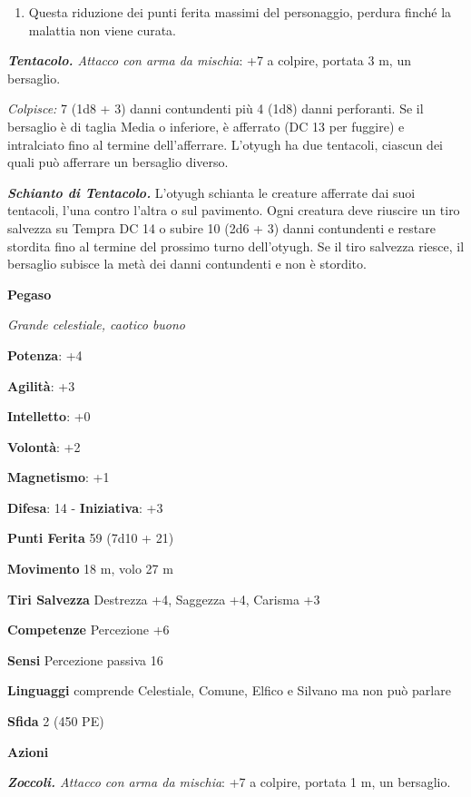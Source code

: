 \begin{multicols}{2}
\begin{enumerate}
\def\labelenumi{\arabic{enumi}.}
\item
  Questa riduzione dei punti ferita massimi del personaggio, perdura
  finché la malattia non viene curata.
\end{enumerate}


\emph{\textbf{Tentacolo.} Attacco con arma da mischia}: +7 a colpire,
portata 3 m, un bersaglio.

\emph{Colpisce:} 7 (1d8 + 3) danni contundenti più 4 (1d8) danni
perforanti. Se il bersaglio è di taglia Media o inferiore, è afferrato
(DC 13 per fuggire) e intralciato fino al termine dell'afferrare.
L'otyugh ha due tentacoli, ciascun dei quali può afferrare un bersaglio
diverso.

\emph{\textbf{Schianto di Tentacolo.}} L'otyugh schianta le creature
afferrate dai suoi tentacoli, l'una contro l'altra o sul pavimento. Ogni
creatura deve riuscire un tiro salvezza su Tempra DC 14 o subire 10 (2d6
+ 3) danni contundenti e restare stordita fino al termine del prossimo
turno dell'otyugh. Se il tiro salvezza riesce, il bersaglio subisce la
metà dei danni contundenti e non è stordito.




\textbf{Pegaso}

\emph{Grande celestiale, caotico buono}

\textbf{Potenza}: +4

\textbf{Agilità}: +3

\textbf{Intelletto}: +0

\textbf{Volontà}: +2

\textbf{Magnetismo}: +1

\textbf{Difesa}: 14 - \textbf{Iniziativa}: +3

\textbf{Punti Ferita} 59 (7d10 + 21)

\textbf{Movimento} 18 m, volo 27 m

\textbf{Tiri Salvezza} Destrezza +4, Saggezza +4, Carisma +3

\textbf{Competenze} Percezione +6

\textbf{Sensi} Percezione passiva 16

\textbf{Linguaggi} comprende Celestiale, Comune, Elfico e Silvano ma non
può parlare

\textbf{Sfida} 2 (450 PE)\smallskip

\smallskip\textbf{Azioni}

\emph{\textbf{Zoccoli.} Attacco con arma da mischia}: +7 a colpire,
portata 1 m, un bersaglio.


\end{multicols}
